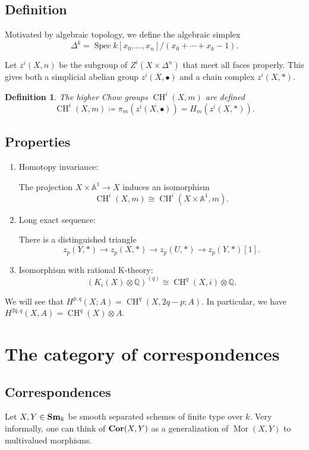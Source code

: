 \documentclass[a4paper, 11pt]{article} %
\newtheorem{definition}[theorem]{Definition}
\theoremstyle{remark}
\newcommand{\?}{{\color{red} ???}}
\newcommand{\mb}{\mathbb}
\newcommand{\Q}{\mb{Q}}
\newcommand{\A}{\mb{A}}
\newcommand{\catname}[1]{{\normalfont\textbf{#1}}}
\newcommand{\Sm}{\catname{Sm}}
\newcommand{\Cor}{\catname{Cor}}
\DeclareMathOperator{\Spec}{Spec}
\DeclareMathOperator{\Mor}{Mor}
\DeclareMathOperator{\CH}{CH}
\begin{document}
\subsection{Definition}

Motivated by algebraic topology, we define the algebraic simplex 
\[
\Delta^k = \Spec k[x_0, \ldots, x_n]/(x_0+\cdots +x_k-1).
\] 

Let $z^i(X, n)$ be the subgroup of $Z^i(X\times \Delta^n)$ that meet all faces properly.   This gives both a simplicial abelian group $z^i(X, \bullet)$ and a chain complex $z^i(X, *)$.  

\begin{definition}
The higher Chow groups $\CH^i(X, m)$ are defined 
\[
\CH^i(X, m)\coloneqq\pi_m(z^i(X, \bullet))=H_m(z^i(X, *)).
\] 
\end{definition}


\subsection{Properties}

\begin{enumerate}
\item Homotopy invariance: 

The projection $X\times \A^1\rightarrow X$ induces an isomorphism 
\[
\CH^i(X, m)\cong \CH^i(X\times \A^1, m).
\] 

\item Long exact sequence: 

There is a distinguished triangle 
\[
z_p(Y, *)\rightarrow z_p(X, *)\rightarrow z_p(U, *)\rightarrow z_p(Y, *)[1].
\]

\item Isomorphism with rational K-theory: 
\[
(K_i(X)\otimes \Q)^{(q)}\cong \CH^q(X, i)\otimes \Q.
\]
\end{enumerate}

We will see that $H^{p, q}(X; A)=\CH^q(X, 2q-p; A)$.  In particular, we have $H^{2q, q}(X, A)=\CH^q(X)\otimes A$. 



\section{The category of correspondences} 
\subsection{Correspondences}
Let $X, Y\in \Sm_k$ be smooth separated schemes of finite type over $k$.  Very informally, one can think of $\Cor(X, Y)$ as a generalization of $\Mor(X, Y)$ to multivalued morphisms. 
\end{document}
